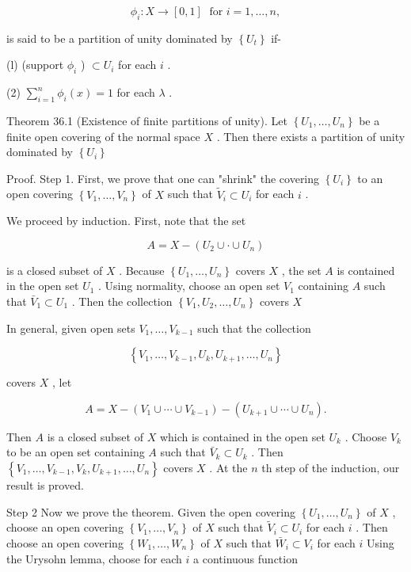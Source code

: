 \documentclass[10pt]{article}
\begin{document}
\[
{\phi }_{i} : X \rightarrow  \left\lbrack  {0,1}\right\rbrack  \;\text{ for }i = 1,\ldots ,n,
\]

is said to be a partition of unity dominated by \(\left\{  {U}_{t}\right\}\) if-

(l) (support \({\phi }_{i}\) ) \(\subset  {U}_{i}\) for each \(i\) .

(2) \(\mathop{\sum }\limits_{{i = 1}}^{n}{\phi }_{i}\left( x\right)  = 1\) for each \(\lambda\) .

Theorem 36.1 (Existence of finite partitions of unity). Let \(\left\{  {{U}_{1},\ldots ,{U}_{n}}\right\}\) be a finite open covering of the normal space \(X\) . Then there exists a partition of unity dominated by \(\left\{  {U}_{i}\right\}\)

Proof. Step 1. First, we prove that one can "shrink" the covering \(\left\{  {U}_{i}\right\}\) to an open covering \(\left\{  {{V}_{1},\ldots ,{V}_{n}}\right\}\) of \(X\) such that \({\widetilde{V}}_{i} \subset  {U}_{i}\) for each \(i\) .

We proceed by induction. First, note that the set

\[
A = X - \left( {{U}_{2} \cup   \cdot   \cup  {U}_{n}}\right)
\]

is a closed subset of \(X\) . Because \(\left\{  {{U}_{1},\ldots ,{U}_{n}}\right\}\) covers \(X\) , the set \(A\) is contained in the open set \({U}_{1}\) . Using normality, choose an open set \({V}_{1}\) containing \(A\) such that \({\bar{V}}_{1} \subset  {U}_{1}\) . Then the collection \(\left\{  {{V}_{1},{U}_{2},\ldots ,{U}_{n}}\right\}\) covers \(X\)

In general, given open sets \({V}_{1},\ldots ,{V}_{k - 1}\) such that the collection

\[
\left\{  {{V}_{1},\ldots ,{V}_{k - 1},{U}_{k},{U}_{k + 1},\ldots ,{U}_{n}}\right\}
\]

covers \(X\) , let

\[
A = X - \left( {{V}_{1} \cup  \cdots  \cup  {V}_{k - 1}}\right)  - \left( {{U}_{k + 1} \cup  \cdots  \cup  {U}_{n}}\right) .
\]

Then \(A\) is a closed subset of \(X\) which is contained in the open set \({U}_{k}\) . Choose \({V}_{k}\) to be an open set containing \(A\) such that \({\bar{V}}_{k} \subset  {U}_{k}\) . Then \(\left\{  {{V}_{1},\ldots ,{V}_{k - 1},{V}_{k},{U}_{k + 1},\ldots ,{U}_{n}}\right\}\) covers \(X\) . At the \(n\) th step of the induction, our result is proved.

Step 2 Now we prove the theorem. Given the open covering \(\left\{  {{U}_{1},\ldots ,{U}_{n}}\right\}\) of \(X\) , choose an open covering \(\left\{  {{V}_{1},\ldots ,{V}_{n}}\right\}\) of \(X\) such that \({\widetilde{V}}_{i} \subset  {U}_{i}\) for each \(i\) . Then choose an open covering \(\left\{  {{W}_{1},\ldots ,{W}_{n}}\right\}\) of \(X\) such that \({\bar{W}}_{i} \subset  {V}_{i}\) for each \(i\) Using the Urysohn lemma, choose for each \(i\) a continuous function
\end{document}
